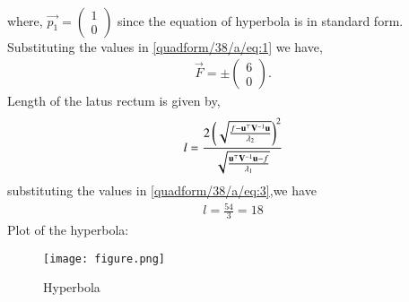 \documentclass[journal,12pt,twocolumn]{IEEEtran}
\newcommand{\myvec}[1]{\ensuremath{\begin{pmatrix}#1\end{pmatrix}}}
\begin{document}
\begin{enumerate}
\begin{align}
\end{align}
where, $\vec{p_1} = \myvec{1 \\ 0}$ since the equation of hyperbola is in standard form.
Substituting the values in \eqref{quadform/38/a/eq:1} we have,
\begin{align}
    \vec{F} = \pm\myvec{ 6 \\ 0}.
\end{align}
Length of the latus rectum is given by,
\begin{align}
    l = \frac{2\left({\sqrt{\frac{f-\mathbf{u}^{\top}\mathbf{V}^{-1}\mathbf{u}}{\lambda_2}}}\right)^2}{\sqrt{\frac{\mathbf{u}^{\top}\mathbf{V}^{-1}\mathbf{u}-f}{\lambda_1}}} \label{quadform/38/a/eq:3}
\end{align}
substituting the values in \eqref{quadform/38/a/eq:3},we have
\begin{align}
   l = \frac{54}{3}= 18
\end{align}
Plot of the hyperbola:

\begin{figure}[!ht]
    \centering
    \texttt{[image: figure.png]}
    \caption{Hyperbola}
    \label{quadform/73/b/fig:hyperbola}
\end{figure}  
\end{enumerate}
\end{document}
